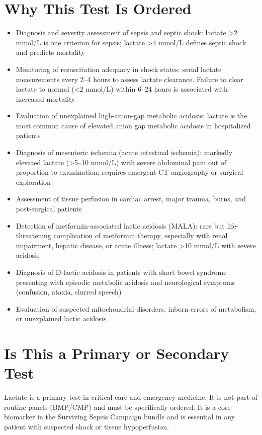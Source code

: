 \section*{Why This Test Is Ordered}
\begin{itemize}
  \item Diagnosis and severity assessment of sepsis and septic shock: lactate >2 mmol/L is one criterion for sepsis; lactate >4 mmol/L defines septic shock and predicts mortality
  \item Monitoring of resuscitation adequacy in shock states: serial lactate measurements every 2--4 hours to assess lactate clearance. Failure to clear lactate to normal (<2 mmol/L) within 6--24 hours is associated with increased mortality
  \item Evaluation of unexplained high-anion-gap metabolic acidosis: lactate is the most common cause of elevated anion gap metabolic acidosis in hospitalized patients
  \item Diagnosis of mesenteric ischemia (acute intestinal ischemia): markedly elevated lactate (>5--10 mmol/L) with severe abdominal pain out of proportion to examination; requires emergent CT angiography or surgical exploration
  \item Assessment of tissue perfusion in cardiac arrest, major trauma, burns, and post-surgical patients
  \item Detection of metformin-associated lactic acidosis (MALA): rare but life-threatening complication of metformin therapy, especially with renal impairment, hepatic disease, or acute illness; lactate >10 mmol/L with severe acidosis
  \item Diagnosis of D-lactic acidosis in patients with short bowel syndrome presenting with episodic metabolic acidosis and neurological symptoms (confusion, ataxia, slurred speech)
  \item Evaluation of suspected mitochondrial disorders, inborn errors of metabolism, or unexplained lactic acidosis
\end{itemize}

\section*{Is This a Primary or Secondary Test}
Lactate is a primary test in critical care and emergency medicine. It is not part of routine panels (BMP/CMP) and must be specifically ordered. It is a core biomarker in the Surviving Sepsis Campaign bundle and is essential in any patient with suspected shock or tissue hypoperfusion.


